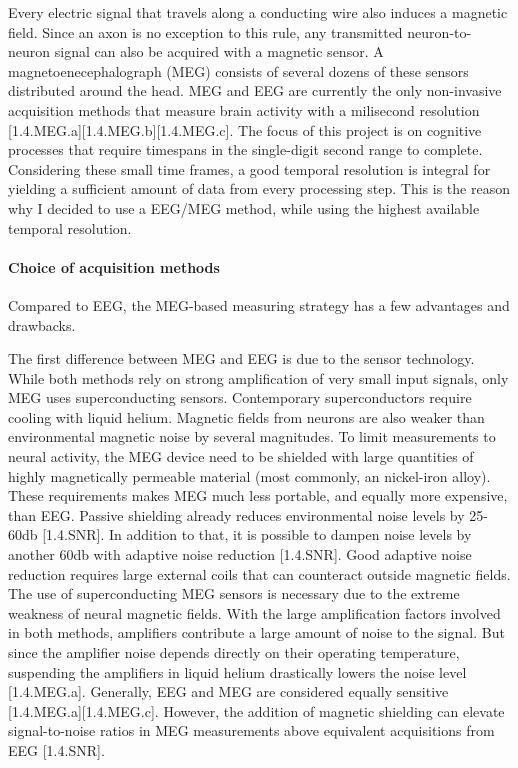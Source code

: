 Every electric signal that travels along a conducting wire also induces a magnetic field.
Since an axon is no exception to this rule, any transmitted neuron-to-neuron signal can also be acquired with a magnetic sensor.
A magnetoenecephalograph (MEG) consists of several dozens of these sensors distributed around the head.
MEG and EEG are currently the only non-invasive acquisition methods that measure brain activity with a milisecond resolution [1.4.MEG.a][1.4.MEG.b][1.4.MEG.c].
The focus of this project is on cognitive processes that require timespans in the single-digit second range to complete.
Considering these small time frames, a good temporal resolution is integral for yielding a sufficient amount of data from every processing step.
This is the reason why I decided to use a EEG/MEG method, while using the highest available temporal resolution.

\paragraph{Choice of acquisition methods}
Compared to EEG, the MEG-based measuring strategy has a few advantages and drawbacks.

The first difference between MEG and EEG is due to the sensor technology.
While both methods rely on strong amplification of very small input signals, only MEG uses superconducting sensors.
Contemporary superconductors require cooling with liquid helium.
Magnetic fields from neurons are also weaker than environmental magnetic noise by several magnitudes.
To limit measurements to neural activity, the MEG device need to be shielded with large quantities of highly magnetically permeable material (most commonly, an nickel-iron alloy).
These requirements makes MEG much less portable, and equally more expensive, than EEG.
Passive shielding already reduces environmental noise levels by 25-60db [1.4.SNR].
In addition to that, it is possible to dampen noise levels by another 60db with adaptive noise reduction [1.4.SNR].
Good adaptive noise reduction requires large external coils that can counteract outside magnetic fields.
The use of superconducting MEG sensors is necessary due to the extreme weakness of neural magnetic fields.
With the large amplification factors involved in both methods, amplifiers contribute a large amount of noise to the signal.
But since the amplifier noise depends directly on their operating temperature, suspending the amplifiers in liquid helium drastically lowers the noise level [1.4.MEG.a].
Generally, EEG and MEG are considered equally sensitive [1.4.MEG.a][1.4.MEG.c].
However, the addition of magnetic shielding can elevate signal-to-noise ratios in MEG measurements above equivalent acquisitions from EEG [1.4.SNR].

